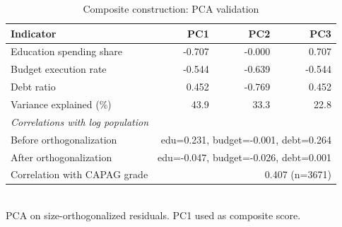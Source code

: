 \begin{table}[h]
\centering
\caption{Composite construction: PCA validation}
\begin{tabular}{lrrr}
\toprule
Indicator & PC1 & PC2 & PC3 \\
\midrule
Education spending share & -0.707 & -0.000 & 0.707 \\
Budget execution rate & -0.544 & -0.639 & -0.544 \\
Debt ratio & 0.452 & -0.769 & 0.452 \\
\midrule
Variance explained (\%) & 43.9 & 33.3 & 22.8 \\
\midrule
\multicolumn{4}{l}{\textit{Correlations with log population}} \\
Before orthogonalization & \multicolumn{3}{r}{edu=0.231, budget=-0.001, debt=0.264} \\
After orthogonalization  & \multicolumn{3}{r}{edu=-0.047, budget=-0.026, debt=0.001} \\
\midrule
Correlation with CAPAG grade & \multicolumn{3}{r}{0.407 (n=3671)} \\
\bottomrule
\end{tabular}
\\[4pt]
\footnotesize{PCA on size-orthogonalized residuals. PC1 used as composite score.}
\end{table}
